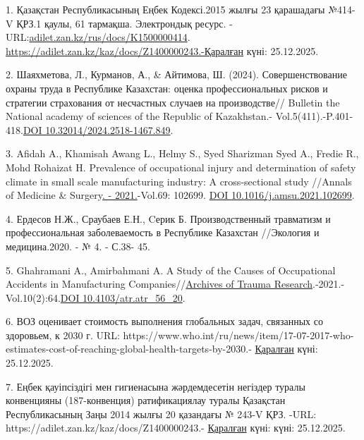 \begin{refs}
1. Қазақстан Республикасының Еңбек Кодексі.2015 жылғы 23 қарашадағы
№414-V ҚРЗ.1 қаулы, 61 тармақша. Электрондық ресурс.
-URL:\href{https://adilet.zan.kz/rus/docs/K1500000414}{adilet.zan.kz/rus/docs/K1500000414}.
\url{https://adilet.zan.kz/kaz/docs/Z1400000243.-Қаралған} күні:
25.12.2025.

2. Шаяхметова, Л., Курманов, А., \& Айтимова, Ш. (2024).
Совершенствование охраны труда в Республике Казахстан: оценка
профессиональных рисков и стратегии страхования от несчастных случаев на
производстве// Bulletin the National academy of sciences of the Republic
of Kazakhstan.-
Vol.5(411).-P.401-418.\href{https://doi.org/10.32014/2024.2518-1467.849}{DOI
10.32014/2024.2518-1467.849}.

3. Afidah A., Khamisah Awang L., Helmy S., Syed Sharizman Syed A.,
Fredie R., Mohd Rohaizat H. Prevalence of occupational injury and
determination of safety climate in small scale manufacturing industry: A
cross-sectional study //Annals of Medicine \&
Surgery\href{file:///C:/Users/admin/Downloads/69.\%20-\%20September\%202021}{.
- 2021.}-Vol.69: 102699.
\href{https://doi.org/10.1016/j.amsu.2021.102699}{DOI
10.1016/j.amsu.2021.102699}.

4. Ердесов Н.Ж., Сраубаев Е.Н., Cерик Б. Производственный травматизм и
профессиональная заболеваемость в Республике Казахстан //Экология и
медицина.2020. - № 4. - С.38- 45.

5. Ghahramani A., Amirbahmani A. A Study of the Causes of Occupational
Accidents in Manufacturing
Companies//\href{https://www.researchgate.net/journal/Archives-of-Trauma-Research-2251-9599?_tp=eyJjb250ZXh0Ijp7ImZpcnN0UGFnZSI6InB1YmxpY2F0aW9uIiwicGFnZSI6InB1YmxpY2F0aW9uIn19}{Archives
of Trauma
Research}.-2021.-Vol.10(2):64.\href{https://doi.org/10.4103/atr.atr_56_20}{DOI
10.4103/atr.atr\_56\_20}.

6. ВОЗ оценивает стоимость выполнения глобальных задач, связанных со
здоровьем, к 2030 г. URL:
https://www.who.int/ru/news/item/17-07-2017-who-estimates-cost-of-reaching-global-health-targets-by-2030.-
\href{https://adilet.zan.kz/kaz/docs/Z1400000243.-Қаралған}{Қаралған}
күні: 25.12.2025.

7. Еңбек қауіпсіздігі мен гигиенасына жәрдемдесетін негіздер туралы
конвенцияны (187-конвенция) ратификациялау туралы Қазақстан
Республикасының Заңы 2014 жылғы 20 қазандағы № 243-V ҚРЗ. -URL:
https://adilet.zan.kz/kaz/docs/Z1400000243.-
\href{https://adilet.zan.kz/kaz/docs/Z1400000243.-Қаралған}{Қаралған}
күні: күні: 25.12.2025.


\end{refs}
